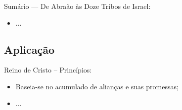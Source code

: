 \documentclass[12pt,aspectratio=169]{beamer}
\newcommand{\ORA}[1]{{\textcolor{TXred!50!TXyel}{#1}}}
\newcommand{\YEL}[1]{{\textcolor{TXyel}{#1}}}
\newcommand{\GRE}[1]{{\textcolor{TXgre}{#1}}}
\begin{document}
    \begin{frame}
        \par\noindent\hspace*{0.05\linewidth}%
        \begin{minipage}{0.9\linewidth}%
            \large%
            \begin{alertblock}{Sumário --- De Abraão às Doze Tribos de Israel:}
                \normalsize
                \begin{itemize}
					\item<1-> ...
                \end{itemize}
            \end{alertblock}
        \end{minipage}%
    \end{frame}

    \subsection{Aplicação}

    \begin{frame}{\YEL{Reino de Cristo} -- Princípios:}
        \begin{itemize}
            \item<1-> Baseia-se no \YEL{acumulado} de \GRE{alianças} e suas \ORA{promessas};
            \item<1-> ...
        \end{itemize}
    \end{frame}

\end{document}
